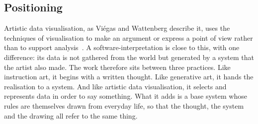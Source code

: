 \subsection{Positioning}

Artistic data visualisation, as Vi{\'e}gas and Wattenberg describe it, uses the techniques of visualisation to make an argument or express a point of view rather than to support analysis~\cite{viegas2007}. A software-interpretation is close to this, with one difference: its data is not gathered from the world but generated by a system that the artist also made. The work therefore sits between three practices. Like instruction art, it begins with a written thought. Like generative art, it hands the realisation to a system. And like artistic data visualisation, it selects and represents data in order to say something. What it adds is a base system whose rules are themselves drawn from everyday life, so that the thought, the system and the drawing all refer to the same thing.
